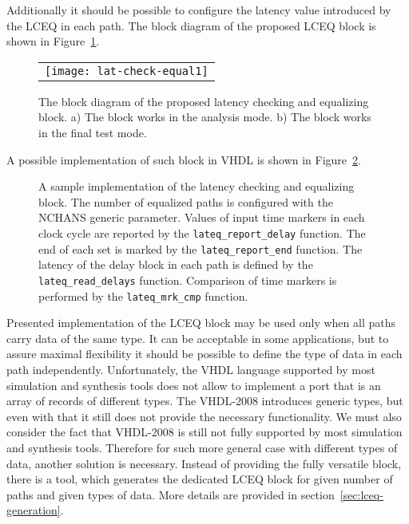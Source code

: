 \documentclass[preprint,11pt]{elsarticle}
\newcommand{\wzcite}[1]{ \cite{#1}}
\begin{document}
Additionally it should be possible to configure the latency value introduced by the LCEQ in each path. The block diagram of the proposed LCEQ block is shown in Figure~\ref{fig:lat-check-eq-1}.
\begin{figure}[t]
 {   
 \begin{center}
    \begin{tabular}{c}
	    \texttt{[image: lat-check-equal1]}
    \end{tabular}
  \end{center}
 \cprotect\caption
  { \label{fig:lat-check-eq-1}
  The block diagram of the proposed latency checking and equalizing block.
  a) The block works in the analysis mode. b) The block works in the final test mode.
  }
 }
\end{figure}

A possible implementation of such block in VHDL is shown in Figure~\ref{fig:lateq-sample-impl1}.
\begin{figure}
 \begin{minipage}{\linewidth}
  {
\scriptsize
\begin{multicols}{2}

   \end{multicols}
  }
 \end{minipage}
 \vspace{1mm}
 \cprotect\caption
 {\label{fig:lateq-sample-impl1}
 A sample implementation of the latency checking and equalizing block.
 The number of equalized paths is configured with the NCHANS generic parameter.
 Values of input time markers in each clock cycle are reported by the 
 \verb|lateq_report_delay| function. The end of each set is marked by the
 \verb|lateq_report_end| function.
 The latency of the delay block in each path is defined by the \verb|lateq_read_delays|
 function.
 Comparison of time markers is performed by the \verb|lateq_mrk_cmp| function.
 }
\end{figure}
 
Presented implementation of the LCEQ block may be used only when all paths carry
data of the same type. It can be acceptable in some applications, but to assure 
maximal flexibility it should be possible to define the type of data in each path independently.
Unfortunately, the VHDL language supported by most simulation and synthesis 
tools does not allow to implement a port that is an array of records of different types. The VHDL-2008\wzcite{Ashenden:1261178} introduces generic types, but even with that it still does not provide the necessary functionality. We must also consider the fact that 
VHDL-2008 is still not fully supported by most simulation and synthesis tools.
Therefore for such more general case with different types of data, another solution
is necessary.
Instead of providing the fully versatile block, there is a tool, which generates the dedicated LCEQ block for given number of paths and given types of data. 
\label{sec:lateqgen-1st}
More details are provided in section~\ref{sec:lceq-generation}.
\end{document}
